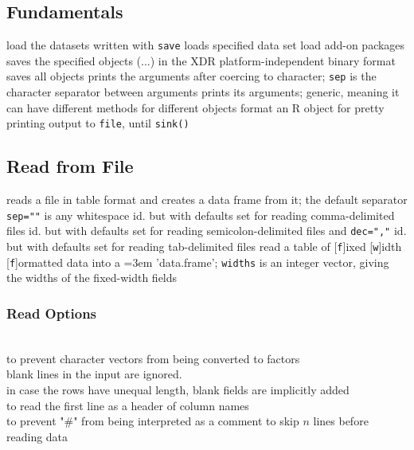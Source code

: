 \subsection{Fundamentals}{}
	{load the datasets written with {\tt save}}
	{loads specified data set}
	{load add-on packages}
	{saves the specified objects (...) in the XDR
    platform-independent binary format}
	{saves all objects}
	{prints the arguments after
    coercing to character; {\tt sep} is the character separator between arguments}
	{prints its arguments; generic, meaning it can
    have different methods for different objects}
	{format an R object for pretty printing}
	{output to {\tt file}, until {\tt sink()}}

\subsection{Read from File}{}
	{reads a file in table format and creates a data frame
from it; the default separator {\tt sep=""} is any whitespace}
	{id. but with defaults set for reading
comma-delimited files}
	{id. but with defaults set for
reading semicolon-delimited files and {\tt dec=","}}
	{id. but with defaults set for reading
tab-delimited files}
	{ read
a table of [{\tt f}]ixed [{\tt w}]idth [{\tt f}]or\-mat\-ted data into a
\emergencystretch=3em 'data.frame'; {\tt widths} is an integer vector, giving
the widths of the fixed-width fields}

\subsubsection{Read Options}{}
 {\\ to prevent character vectors from being converted to factors}
 {\\ blank lines in the input are ignored.}
 {\\ in case the rows have unequal length, blank fields are implicitly added}
 {\\ to read the first line as a header of column names}
 {\\ to prevent "\#" from being interpreted as a comment}
 {to skip $n$ lines before reading data}

